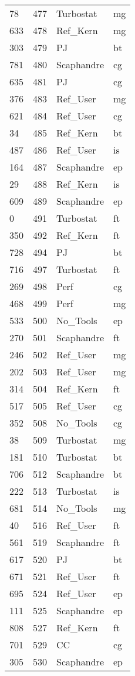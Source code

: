 \begin{tabular}{lrll}
78 & 477 & Turbostat & mg \\
633 & 478 & Ref_Kern & mg \\
303 & 479 & PJ & bt \\
781 & 480 & Scaphandre & cg \\
635 & 481 & PJ & cg \\
376 & 483 & Ref_User & mg \\
621 & 484 & Ref_User & cg \\
34 & 485 & Ref_Kern & bt \\
487 & 486 & Ref_User & is \\
164 & 487 & Scaphandre & ep \\
29 & 488 & Ref_Kern & is \\
609 & 489 & Scaphandre & ep \\
0 & 491 & Turbostat & ft \\
350 & 492 & Ref_Kern & ft \\
728 & 494 & PJ & bt \\
716 & 497 & Turbostat & ft \\
269 & 498 & Perf & cg \\
468 & 499 & Perf & mg \\
533 & 500 & No_Tools & ep \\
270 & 501 & Scaphandre & ft \\
246 & 502 & Ref_User & mg \\
202 & 503 & Ref_User & mg \\
314 & 504 & Ref_Kern & ft \\
517 & 505 & Ref_User & cg \\
352 & 508 & No_Tools & cg \\
38 & 509 & Turbostat & mg \\
181 & 510 & Turbostat & bt \\
706 & 512 & Scaphandre & bt \\
222 & 513 & Turbostat & is \\
681 & 514 & No_Tools & mg \\
40 & 516 & Ref_User & ft \\
561 & 519 & Scaphandre & ft \\
617 & 520 & PJ & bt \\
671 & 521 & Ref_User & ft \\
695 & 524 & Ref_User & ep \\
111 & 525 & Scaphandre & ep \\
808 & 527 & Ref_Kern & ft \\
701 & 529 & CC & cg \\
305 & 530 & Scaphandre & ep \\

\end{tabular}
